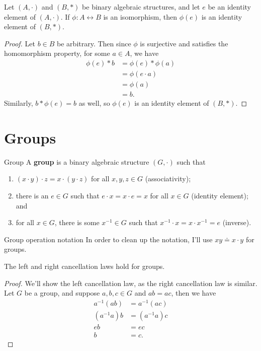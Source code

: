 \documentclass[10pt]{report}
\begin{document}
\begin{prop}
	Let $(A, \cdot)$ and $(B, *)$ be binary algebraic structures, and let $e$ be an identity element of $ (A, \cdot)$. If $\phi: A \leftrightarrow B$ is an isomorphism, then $\phi(e)$ is an identity element of $(B, *)$.
\end{prop}
\begin{proof}
	Let $b \in B$ be arbitrary. Then since $\phi$ is surjective and satisfies the homomorphism property, for some $a \in A$, we have
	\begin{align*}
		\phi(e) * b &= \phi(e) * \phi(a) \\
			    &= \phi(e \cdot a) \\
			    &= \phi(a) \\
			    &= b.
	\end{align*}
	Similarly, $b * \phi(e) = b$ as well, so $\phi(e)$ is an identity element of $(B, *)$.
\end{proof}


\section{Groups}


\begin{defn}{Group}{}
A \textbf{group} is a binary algebraic structure $(G, \cdot)$ such that
\begin{enumerate}
	\item $(x\cdot y) \cdot z = x \cdot (y \cdot z)$ for all $x,y,z \in G$ (associativity);
	\item there is an $e \in G$ such that $e \cdot x = x \cdot e = x$ for all $x \in G$ (identity element); and
	\item for all $x \in G$, there is some $x^{-1} \in G$ such that $x^{-1} \cdot x = x \cdot x^{-1} = e$ (inverse).
\end{enumerate}
\end{defn}

\begin{note}{Group operation notation}{}
In order to clean up the notation, I'll use $xy \doteq x \cdot y$ for groups.
\end{note}

\begin{prop}
	The left and right cancellation laws hold for groups.
\end{prop}
\begin{proof}
	We'll show the left cancellation law, as the right cancellation law is similar. Let $G$ be a group, and suppose $a,b,c \in G$ and $ab = ac$, then we have
\begin{align*}
	a^{-1} (ab) &= a^{-1} (ac) \\
	(a^{-1} a) b &= (a^{-1} a) c \\
	e b &= e c \\
	b &= c.
\end{align*}
\end{proof}
\end{document}
